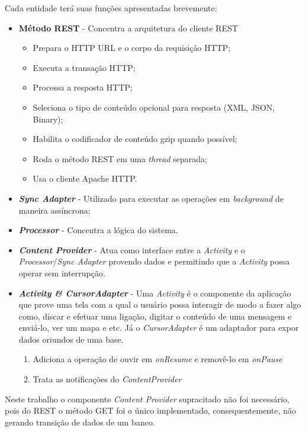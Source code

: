 \documentclass[12pt,a4paper,oneside]{report}
\begin{document}
Cada entidade terá suas funções apresentadas brevemente:
\begin{itemize}
    \item \textbf{Método REST} - Concentra a arquitetura do cliente REST
	\begin{itemize}
	    \item Prepara o HTTP URL e o corpo da requisição HTTP;
	    \item Executa a transação HTTP;
	    \item Processa a resposta HTTP;
	    \item Seleciona o tipo de conteúdo opcional para resposta (XML, JSON, Binary);
	    \item Habilita o codificador de conteúdo gzip quando possível;
	    \item Roda o método REST em uma \emph{thread} separada;
	    \item Usa o cliente Apache HTTP.
	\end{itemize}
    \item \textbf{\emph{Sync Adapter}} - Utilizado para executar as operações em \emph{background} de maneira assíncrona;
    \item \textbf{\emph{Processor}} - Concentra a lógica do sistema.
    \item \textbf{\emph{Content Provider}} - Atua como interface entre a \emph{Activity} e o \emph{Processor}/\emph{Sync Adapter} provendo dados e permitindo que a \emph{Activity} possa operar sem interrupção.
    \item \textbf{\emph{Activity \& CursorAdapter}} - Uma \emph{Activity} é o componente da aplicação que prove uma tela com a qual o usuário possa interagir de modo a fazer algo como, discar e efetuar uma ligação, digitar o conteúdo de uma mensagem e enviá-lo, ver um mapa e etc. Já o \emph{CursorAdapter} é um adaptador para expor dados oriundos de uma base.
    \begin{enumerate}
	\item Adiciona a operação de ouvir em \emph{onResume} e removê-lo em \emph{onPause}
	\item Trata as notificações do \emph{ContentProvider}
    \end{enumerate}

\end{itemize}

Neste trabalho o componente \emph{Content Provider} supracitado não foi necessário, pois do REST o método GET foi o único implementado, consequentemente, não gerando transição de dados de um banco.
\end{document}
